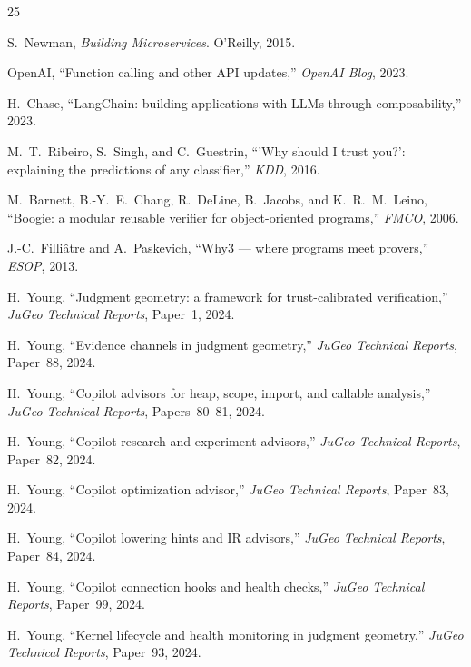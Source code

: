 \documentclass[11pt]{article}
\begin{document}
\begin{thebibliography}{25}

S.~Newman,
\emph{Building Microservices}.
O'Reilly, 2015.

OpenAI,
``Function calling and other API updates,''
\emph{OpenAI Blog}, 2023.

H.~Chase,
``LangChain: building applications with LLMs through
composability,''
2023.

M.~T.~Ribeiro, S.~Singh, and C.~Guestrin,
``'Why should I trust you?': explaining the predictions
of any classifier,''
\emph{KDD}, 2016.

M.~Barnett, B.-Y.~E.~Chang, R.~DeLine, B.~Jacobs, and
K.~R.~M.~Leino,
``Boogie: a modular reusable verifier for object-oriented
programs,''
\emph{FMCO}, 2006.

J.-C.~Filli\^{a}tre and A.~Paskevich,
``Why3 --- where programs meet provers,''
\emph{ESOP}, 2013.

H.~Young,
``Judgment geometry: a framework for trust-calibrated
verification,''
\emph{JuGeo Technical Reports}, Paper~1, 2024.

H.~Young,
``Evidence channels in judgment geometry,''
\emph{JuGeo Technical Reports}, Paper~88, 2024.

H.~Young,
``Copilot advisors for heap, scope, import, and callable
analysis,''
\emph{JuGeo Technical Reports}, Papers~80--81, 2024.

H.~Young,
``Copilot research and experiment advisors,''
\emph{JuGeo Technical Reports}, Paper~82, 2024.

H.~Young,
``Copilot optimization advisor,''
\emph{JuGeo Technical Reports}, Paper~83, 2024.

H.~Young,
``Copilot lowering hints and IR advisors,''
\emph{JuGeo Technical Reports}, Paper~84, 2024.

H.~Young,
``Copilot connection hooks and health checks,''
\emph{JuGeo Technical Reports}, Paper~99, 2024.

H.~Young,
``Kernel lifecycle and health monitoring in judgment geometry,''
\emph{JuGeo Technical Reports}, Paper~93, 2024.


\end{thebibliography}
\end{document}
